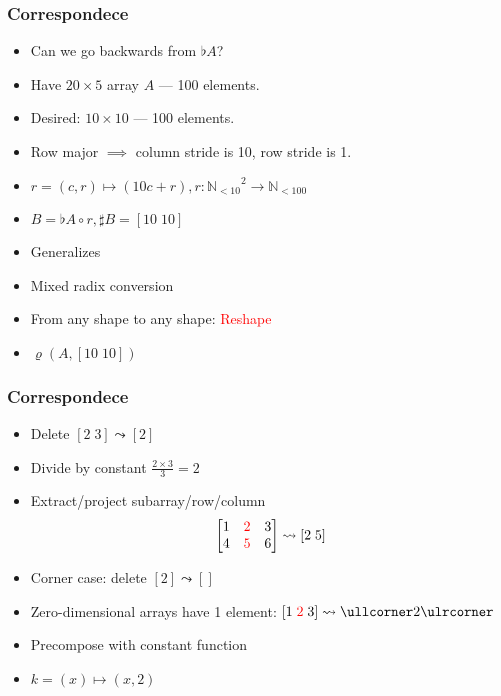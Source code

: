 \documentclass[xetex,mathserif,serif]{beamer}
\let\amsleadsto\leadsto
\let\leadsto\amsleadsto
\newcommand\Nat{\mathbb{N}}
\newcommand\NB[1]{\textcolor{red}{#1}}
\begin{document}
\begin{frame}
  \frametitle{Correspondece}
  \begin{itemize}%
    \item Can we go backwards from \(\flat A\)?
    \item Have \(20\times 5\) array \(A\) --- 100 elements.
    \item Desired: \(10 \times 10\) --- 100 elements.
    \item Row major \(\implies\) column stride is 10, row stride is 1.
    \item \(r = (c, r)\mapsto (10c + r), r : {\Nat_{<10}}^2 \to \Nat_{<100}\)
    \item \(B = \flat A \circ r, \sharp B = [10\;10]\)
    \item Generalizes
    \item Mixed radix conversion
    \item From any shape to any shape: \NB{Reshape}
    \item \(\varrho(A, [10\;10])\)
  \end{itemize}
\end{frame}

\begin{frame}
  \frametitle{Correspondece}
  \begin{itemize}%
    \item Delete \([2\;3] \leadsto [2]\)
    \item Divide by constant \(\frac{2 \times 3} 3 = 2\)
    \item Extract/project subarray/row/column
      \[
        \begin{bmatrix}
          1 & \NB 2 & 3 \\ 4 & \NB 5 & 6
        \end{bmatrix} \leadsto
        [2\;5]
      \]
    \item Corner case: delete \([2] \leadsto []\)
    \item Zero-dimensional arrays have 1 element: \([1\;\NB 2\;3] \leadsto \ullcorner 2 \ulrcorner\)
    \item Precompose with constant function
    \item \(k = (x)\mapsto (x, 2)\)
  \end{itemize}
\end{frame}
\end{document}
